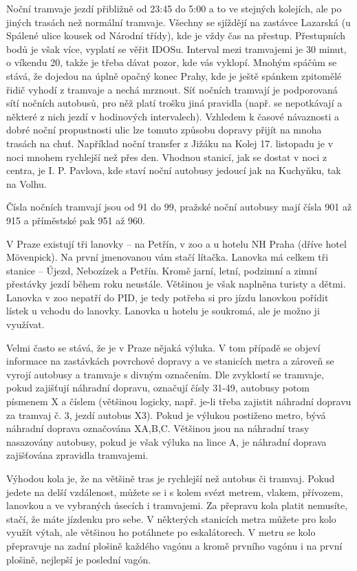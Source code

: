 Noční tramvaje jezdí přibližně od 23:45 do 5:00 a to ve stejných kolejích, ale
po jiných trasách než normální tramvaje. Všechny se sjíždějí na zastávce
Lazarská (u Spálené ulice kousek od Národní třídy), kde je vždy čas na přestup.
Přestupních bodů je však více, vyplatí se věřit IDOSu. Interval mezi tramvajemi
je 30 minut, o víkendu 20, takže je třeba dávat pozor, kde vás vyklopí. Mnohým
spáčům se stává, že dojedou na úplně opačný konec Prahy, kde je ještě spánkem
zpitomělé řidič vyhodí z tramvaje a nechá mrznout. Síť nočních tramvají je
podporovaná sítí nočních autobusů, pro něž platí trošku jiná pravidla (např. se
nepotkávají a některé z nich jezdí v hodinových intervalech). Vzhledem k časové
návaznosti a dobré noční propustnosti ulic lze tomuto způsobu dopravy přijít na
mnoha trasách na chuť. Například noční transfer z Jižáku na Kolej 17. listopadu
je v noci mnohem rychlejší než přes den. Vhodnou stanicí, jak se dostat v noci z
centra, je I. P. Pavlova, kde staví noční autobusy jedoucí jak na Kuchyňku, tak
na Volhu.

Čísla nočních tramvají jsou od 91 do 99, pražské noční autobusy mají čísla 901
až 915 a příměstské pak 951 až 960.


V Praze existují tři lanovky – na Petřín, v zoo a u hotelu NH Praha (dříve hotel
Mövenpick). Na první jmenovanou vám stačí lítačka. Lanovka má celkem tři stanice
– Újezd, Nebozízek a Petřín. Kromě jarní, letní, podzimní a zimní přestávky
jezdí během roku neustále. Většinou je však naplněna turisty a dětmi. Lanovka v
zoo nepatří do PID, je tedy potřeba si pro jízdu lanovkou pořídit lístek u
vchodu do lanovky. Lanovka u hotelu je soukromá, ale je možno ji využívat.


Velmi často se stává, že je v Praze nějaká výluka. V tom případě se objeví
informace na zastávkách povrchové dopravy a ve stanicích metra a zároveň se
vyrojí autobusy a tramvaje s divným označením. Dle zvyklostí se tramvaje, pokud
zajišťují náhradní dopravu, označují čísly 31-49, autobusy potom písmenem X a
číslem (většinou logicky, např. je-li třeba zajistit náhradní dopravu za tramvaj
č. 3, jezdí autobus X3). Pokud je výlukou postiženo metro, bývá náhradní doprava
označována X{A,B,C}. Většinou jsou na náhradní trasy nasazovány autobusy, pokud
je však výluka na lince A, je náhradní doprava zajišťována zpravidla tramvajemi.


Výhodou kola je, že na většině tras je rychlejší než autobus či tramvaj. Pokud
jedete na delší vzdálenost, můžete se i s kolem svézt metrem, vlakem, přívozem,
lanovkou a ve vybraných úsecích i tramvajemi. Za přepravu kola platit nemusíte,
stačí, že máte jízdenku pro sebe. V některých stanicích metra můžete pro kolo
využít výtah, ale většinou ho potáhnete po eskalátorech. V metru se kolo
přepravuje na zadní plošině každého vagónu a kromě prvního vagónu i na první
plošině, nejlepší je poslední vagón.


